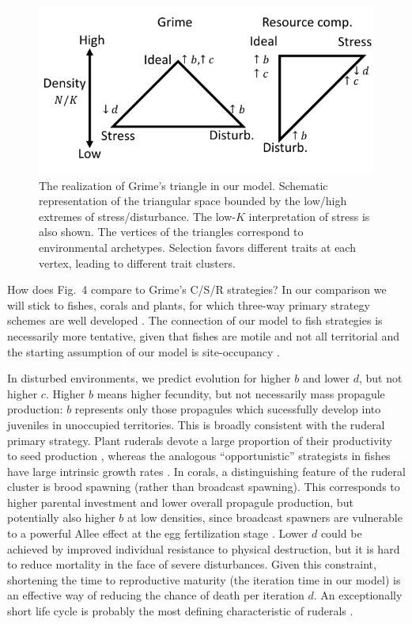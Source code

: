 \documentclass[11pt]{article}
\begin{document}
\begin{figure}
\centering
\includegraphics[scale=1]{axes.pdf}
\caption{\label{fig:axes} The realization of Grime's triangle in our model. Schematic representation of the triangular space bounded by the low/high extremes of stress/disturbance. The low-$K$ interpretation of stress is also shown. The vertices of the triangles correspond to environmental archetypes. Selection favors different traits at each vertex, leading to different trait clusters.} 
\end{figure}

How does Fig.~4 compare to Grime's C/S/R strategies? In our comparison we will stick to fishes, corals and plants, for which three-way primary strategy schemes are well developed \citep{grime_1977,winemiller_1992,darling_2012}. The connection of our model to fish strategies is necessarily more tentative, given that fishes are motile and not all territorial and the starting assumption of our model is site-occupancy . 

In disturbed environments, we predict evolution for higher $b$ and lower $d$, but not higher $c$. Higher $b$ means higher fecundity, but not necessarily mass propagule production: $b$ represents only those propagules which sucessfully develop into juveniles in unoccupied territories. This is broadly consistent with the ruderal primary strategy. Plant ruderals devote a large proportion of their productivity to seed production \cite{grime_1977}, whereas the analogous ``opportunistic'' strategists in fishes have large intrinsic growth rates \citep{winemiller_1992}. In corals, a distinguishing feature of the ruderal cluster is brood spawning (rather than broadcast spawning). This corresponds to higher parental investment and lower overall propagule production, but potentially also higher $b$ at low densities, since broadcast spawners are vulnerable to a powerful Allee effect at the egg fertilization stage \citep{knowlton_2001}. Lower $d$ could be achieved by improved individual resistance to physical destruction, but it is hard to reduce mortality in the face of severe disturbances. Given this constraint, shortening the time to reproductive maturity (the iteration time in our model) is an effective way of reducing the chance of death per iteration $d$. An exceptionally short life cycle is probably the most defining characteristic of ruderals \citep{grime_1977,winemiller_1992,darling_2012}.
\end{document}
